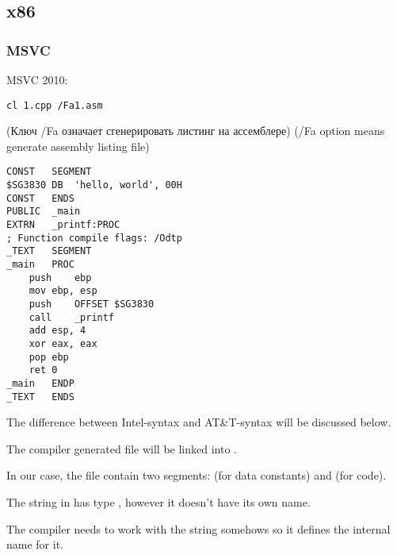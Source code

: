 ﻿\subsection{x86}

\subsubsection{MSVC}

 MSVC 2010:

\begin{lstlisting}
cl 1.cpp /Fa1.asm
\end{lstlisting}

\IFRU
{(Ключ /Fa означает сгенерировать листинг на ассемблере)}
{(/Fa option means generate assembly listing file)}

\begin{lstlisting}[caption=MSVC 2010]
CONST	SEGMENT
$SG3830	DB	'hello, world', 00H
CONST	ENDS
PUBLIC	_main
EXTRN	_printf:PROC
; Function compile flags: /Odtp
_TEXT	SEGMENT
_main	PROC
	push	ebp
	mov	ebp, esp
	push	OFFSET $SG3830
	call	_printf
	add	esp, 4
	xor	eax, eax
	pop	ebp
	ret	0
_main	ENDP
_TEXT	ENDS
\end{lstlisting}

{The difference between Intel-syntax and AT\&T-syntax will be discussed below.}

{The compiler generated  file will be linked into .}

{In our case, the file contain two segments:  (for data constants) and  (for code).} 

{The string  in \CCpp has type , however it doesn't have
its own name.}

{The compiler needs to work with the string somehows so it defines the internal name  for it.}

